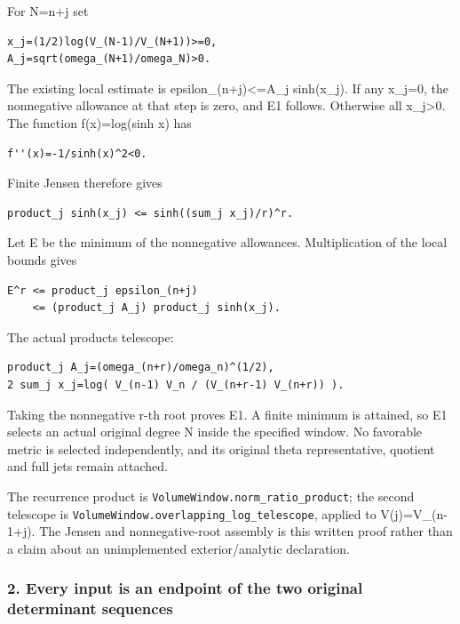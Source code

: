 For N=n+j set

\begin{verbatim}
x_j=(1/2)log(V_(N-1)/V_(N+1))>=0,
A_j=sqrt(omega_(N+1)/omega_N)>0.
\end{verbatim}

The existing local estimate is epsilon\_(n+j)\textless=A\_j sinh(x\_j). If any x\_j=0, the nonnegative allowance at that step is zero, and E1 follows. Otherwise all x\_j\textgreater0. The function f(x)=log(sinh x) has

\begin{verbatim}
f''(x)=-1/sinh(x)^2<0.
\end{verbatim}

Finite Jensen therefore gives

\begin{verbatim}
product_j sinh(x_j) <= sinh((sum_j x_j)/r)^r.
\end{verbatim}

Let E be the minimum of the nonnegative allowances. Multiplication of the local bounds gives

\begin{verbatim}
E^r <= product_j epsilon_(n+j)
    <= (product_j A_j) product_j sinh(x_j).
\end{verbatim}

The actual products telescope:

\begin{verbatim}
product_j A_j=(omega_(n+r)/omega_n)^(1/2),
2 sum_j x_j=log( V_(n-1) V_n / (V_(n+r-1) V_(n+r)) ).
\end{verbatim}

Taking the nonnegative r-th root proves E1. A finite minimum is attained, so E1 selects an actual original degree N inside the specified window. No favorable metric is selected independently, and its original theta representative, quotient and full jets remain attached.

The recurrence product is \nolinkurl{VolumeWindow.norm_ratio_product}; the second telescope is \nolinkurl{VolumeWindow.overlapping_log_telescope}, applied to V(j)=V\_(n-1+j). The Jensen and nonnegative-root assembly is this written proof rather than a claim about an unimplemented exterior/analytic declaration.

\subsubsection{2. Every input is an endpoint of the two original determinant sequences}\label{endpoint-pr23_original--every-input-is-an-endpoint-of-the-two-original-determinant-sequences}

